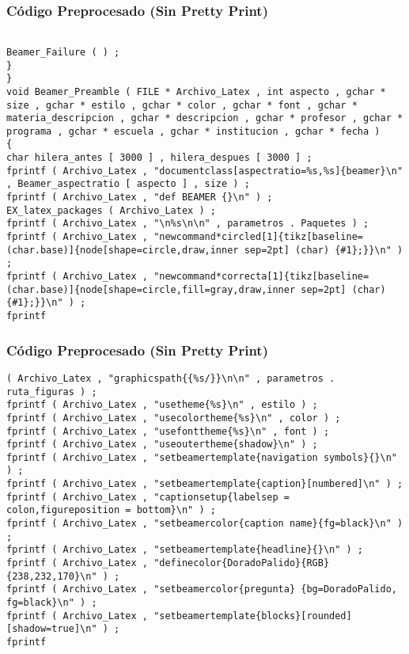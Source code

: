 \documentclass{beamer}
\begin{document}
\begin{frame}[fragile]
\frametitle{C\'odigo Preprocesado (Sin Pretty Print)}
\begin{lstlisting}[style=CStyle]

Beamer_Failure ( ) ; 
} 
} 
void Beamer_Preamble ( FILE * Archivo_Latex , int aspecto , gchar * size , gchar * estilo , gchar * color , gchar * font , gchar * materia_descripcion , gchar * descripcion , gchar * profesor , gchar * programa , gchar * escuela , gchar * institucion , gchar * fecha ) 
{ 
char hilera_antes [ 3000 ] , hilera_despues [ 3000 ] ; 
fprintf ( Archivo_Latex , "documentclass[aspectratio=%s,%s]{beamer}\n" , Beamer_aspectratio [ aspecto ] , size ) ; 
fprintf ( Archivo_Latex , "def BEAMER {}\n" ) ; 
EX_latex_packages ( Archivo_Latex ) ; 
fprintf ( Archivo_Latex , "\n%s\n\n" , parametros . Paquetes ) ; 
fprintf ( Archivo_Latex , "newcommand*circled[1]{tikz[baseline=(char.base)]{node[shape=circle,draw,inner sep=2pt] (char) {#1};}}\n" ) ; 
fprintf ( Archivo_Latex , "newcommand*correcta[1]{tikz[baseline=(char.base)]{node[shape=circle,fill=gray,draw,inner sep=2pt] (char) {#1};}}\n" ) ; 
fprintf \end{lstlisting}
\end{frame}
\begin{frame}[fragile]
\frametitle{C\'odigo Preprocesado (Sin Pretty Print)}
\begin{lstlisting}[style=CStyle]
( Archivo_Latex , "graphicspath{{%s/}}\n\n" , parametros . ruta_figuras ) ; 
fprintf ( Archivo_Latex , "usetheme{%s}\n" , estilo ) ; 
fprintf ( Archivo_Latex , "usecolortheme{%s}\n" , color ) ; 
fprintf ( Archivo_Latex , "usefonttheme{%s}\n" , font ) ; 
fprintf ( Archivo_Latex , "useoutertheme{shadow}\n" ) ; 
fprintf ( Archivo_Latex , "setbeamertemplate{navigation symbols}{}\n" ) ; 
fprintf ( Archivo_Latex , "setbeamertemplate{caption}[numbered]\n" ) ; 
fprintf ( Archivo_Latex , "captionsetup{labelsep = colon,figureposition = bottom}\n" ) ; 
fprintf ( Archivo_Latex , "setbeamercolor{caption name}{fg=black}\n" ) ; 
fprintf ( Archivo_Latex , "setbeamertemplate{headline}{}\n" ) ; 
fprintf ( Archivo_Latex , "definecolor{DoradoPalido}{RGB}{238,232,170}\n" ) ; 
fprintf ( Archivo_Latex , "setbeamercolor{pregunta} {bg=DoradoPalido, fg=black}\n" ) ; 
fprintf ( Archivo_Latex , "setbeamertemplate{blocks}[rounded][shadow=true]\n" ) ; 
fprintf \end{lstlisting}
\end{frame}
\end{document}
